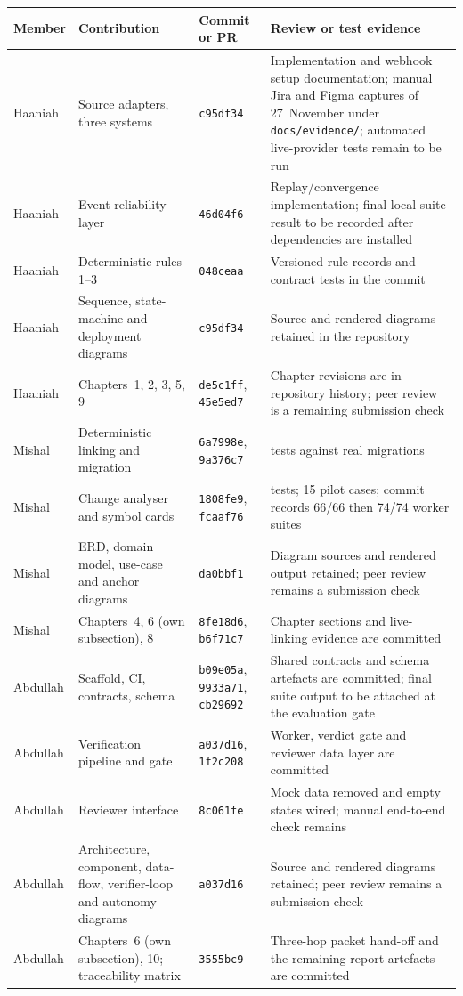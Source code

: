\begin{longtable}{>{\raggedright\arraybackslash}p{}>{\raggedright\arraybackslash}p{}>{\raggedright\arraybackslash}p{}>{\raggedright\arraybackslash}p{}}
\toprule
Member & Contribution & Commit or PR & Review or test evidence \\
\midrule
\endhead
Haaniah & Source adapters, three systems & \texttt{c95df34} & Implementation and webhook setup documentation; manual Jira and Figma captures of 27~November under \texttt{docs/\allowbreak{}evidence/}; automated live-provider tests remain to be run \\
Haaniah & Event reliability layer & \texttt{46d04f6} & Replay/convergence implementation; final local suite result to be recorded after dependencies are installed \\
Haaniah & Deterministic rules 1--3 & \texttt{048ceaa} & Versioned rule records and contract tests in the commit \\
Haaniah & Sequence, state-machine and deployment diagrams & \texttt{c95df34} & Source and rendered diagrams retained in the repository \\
Haaniah & Chapters~1, 2, 3, 5, 9 & \texttt{de5c1ff}, \texttt{45e5ed7} & Chapter revisions are in repository history; peer review is a remaining submission check \\
Mishal & Deterministic linking and migration & \texttt{6a7998e}, \texttt{9a376c7} & 16 tests against real migrations \\
Mishal & Change analyser and symbol cards & \texttt{1808fe9}, \texttt{fcaaf76} & 20 tests; 15 pilot cases; commit records 66/66 then 74/74 worker suites \\
Mishal & ERD, domain model, use-case and anchor diagrams & \texttt{da0bbf1} & Diagram sources and rendered output retained; peer review remains a submission check \\
Mishal & Chapters~4, 6 (own subsection), 8 & \texttt{8fe18d6}, \texttt{b6f71c7} & Chapter sections and live-linking evidence are committed \\
Abdullah & Scaffold, CI, contracts, schema & \texttt{b09e05a}, \texttt{9933a71}, \texttt{cb29692} & Shared contracts and schema artefacts are committed; final suite output to be attached at the evaluation gate \\
Abdullah & Verification pipeline and gate & \texttt{a037d16}, \texttt{1f2c208} & Worker, verdict gate and reviewer data layer are committed \\
Abdullah & Reviewer interface & \texttt{8c061fe} & Mock data removed and empty states wired; manual end-to-end check remains \\
Abdullah & Architecture, component, data-flow, verifier-loop and autonomy
  diagrams & \texttt{a037d16} & Source and rendered diagrams retained; peer review remains a submission check \\
Abdullah & Chapters~6 (own subsection), 10; traceability matrix & \texttt{3555bc9} & Three-hop packet hand-off and the remaining report artefacts are committed \\
\bottomrule
\end{longtable}

